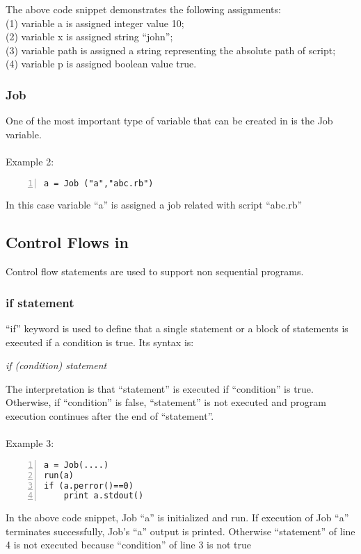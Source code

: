 The above code snippet demonstrates the following assignments:\\
(1) variable a is assigned integer value 10;\\
(2) variable x is assigned string ``john'';\\
(3) variable path is assigned a string representing the absolute path of script;\\
(4) variable p is assigned boolean value true.

\subsubsection*{Job}
One of the most important type of variable that can be created in \lang{} is the Job variable.\\
\\
Example 2:
\begin{Verbatim}[numbers=left]
a = Job ("a","abc.rb")
\end{Verbatim}
In this case variable ``a'' is assigned a job related with script ``abc.rb'' 

\subsection*{Control Flows in \lang{}}
Control flow statements are used to support non sequential \lang{} programs.
\subsubsection*{if statement}
``if'' keyword is used to define that a single statement or a block of statements is executed if a condition is true. Its syntax is:

\textit{if (condition) statement}

\noindent The interpretation is that ``statement'' is executed if ``condition'' is true. 
Otherwise, if ``condition'' is false, ``statement'' is not executed and program execution continues after the end of ``statement''.
\\
\\
Example 3:
\begin{Verbatim}[numbers=left]
a = Job(....)
run(a)
if (a.perror()==0)
    print a.stdout()
\end{Verbatim}

In the above code snippet, Job ``a'' is initialized and run. If execution of Job ``a'' terminates successfully, Job's ``a'' output is printed. 
Otherwise ``statement'' of line 4 is not executed because ``condition'' of line 3 is not true

